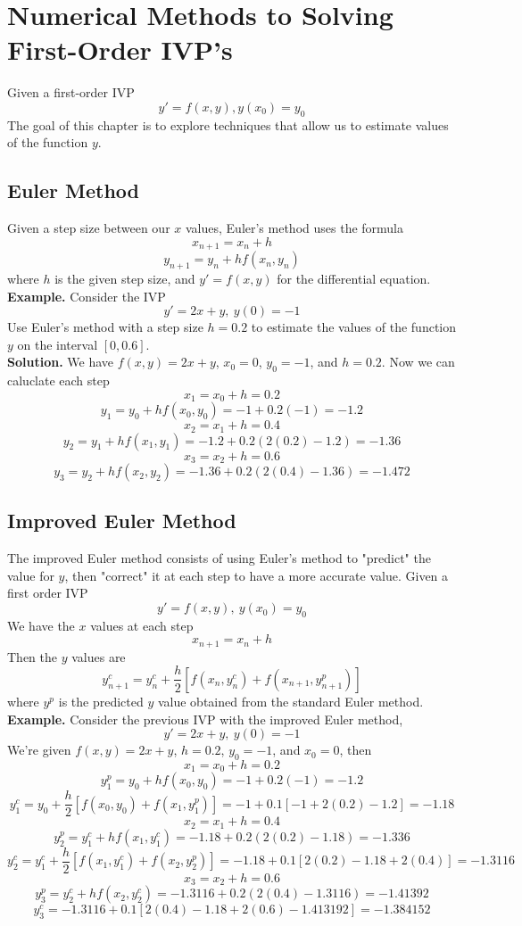 \documentclass[openany]{report}
\begin{document}
\chapter{Numerical Methods to Solving First-Order IVP's}

Given a first-order IVP 
\[y' = f(x,y), y(x_0) = y_0\]
The goal of this chapter is to explore techniques that allow us to estimate values of the function $y$. 

\section{Euler Method}

Given a step size between our $x$ values, Euler's method uses the formula 
\[x_{n+1} = x_n + h\]
\[y_{n+1} = y_n + hf(x_n, y_n)\]
where $h$ is the given step size, and $y' = f(x,y)$ for the differential equation. \\[2ex]
\textbf{Example.} Consider the IVP 
\[y' = 2x + y, \ y(0) = -1\]
Use Euler's method with a step size $h = 0.2$ to estimate the values of the function $y$ on the interval $[0,0.6]$. \\[1ex]

\textbf{Solution.} We have $f(x,y) = 2x + y$, $x_0 = 0$, $y_0 = -1$, and $h = 0.2$. Now we can caluclate each step 
\[x_1 = x_0 + h = 0.2\]
\[y_1 = y_0 + h f(x_0,y_0) = -1 + 0.2(-1) = -1.2\]
\[x_2 = x_1 + h = 0.4\]
\[y_2 = y_1 + hf(x_1,y_1) = -1.2 + 0.2(2(0.2) - 1.2) = -1.36\]
\[x_3 = x_2 + h = 0.6\]
\[y_3 = y_2 + hf(x_2,y_2) = -1.36 + 0.2(2(0.4) - 1.36) = -1.472\]


\section{Improved Euler Method}

The improved Euler method consists of using Euler's method to "predict" the value for $y$, then "correct" it at each step to have a more accurate value. Given a first order IVP 
\[y' = f(x,y), \ y(x_0) = y_0\]
We have the $x$ values at each step 
\[x_{n+1} = x_n + h\]
Then the $y$ values are 
\[y^c_{n+1} = y_n^c + \frac{h}{2}\left[f(x_n,y_n^c) + f(x_{n+1}, y^p_{n+1})\right]\]
where $y^p$ is the predicted $y$ value obtained from the standard Euler method.\\[2ex]

\textbf{Example.} Consider the previous IVP with the improved Euler method, 
\[y' = 2x+y, \ y(0) = -1\]
We're given $f(x,y) = 2x + y$, $h = 0.2$, $y_0 = -1$, and $x_0 = 0$, then 
\[x_1 = x_0 + h = 0.2\]
\[y_1^p = y_0 + h f(x_0, y_0) = -1 + 0.2(-1) = -1.2\] 
\[y_1^c = y_0 + \frac{h}{2}\left[f(x_0,y_0) + f(x_1,y_1^p)\right] = -1 + 0.1 \left[-1 + 2(0.2) - 1.2\right] = -1.18\]
\[x_2 = x_1 + h = 0.4\]
\[y_2^p = y_1^c + h f(x_1, y_1^c) = -1.18 + 0.2(2(0.2) - 1.18) = -1.336\]
\[y_2^c = y_1^c + \frac{h}{2}\left[f(x_1,y_1^c) + f(x_2,y_2^p)\right] = -1.18 + 0.1\left[2(0.2) - 1.18 + 2(0.4)\right] = -1.3116\]
\[x_3 = x_2 + h = 0.6\]
\[y_3^p = y_2^c + hf(x_2, y_2^c) = -1.3116 + 0.2(2(0.4) - 1.3116) = -1.41392\]
\[y_3^c = -1.3116 + 0.1\left[2(0.4) - 1.18 + 2(0.6) - 1.413192\right] = -1.384152\]
\end{document}
